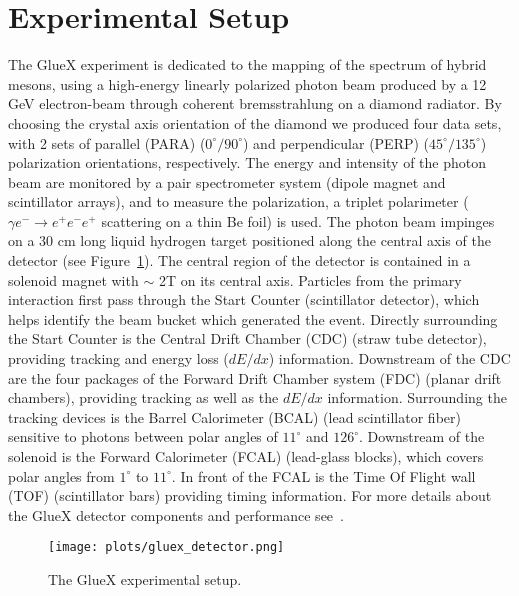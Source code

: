 \documentclass[a4paper]{jpconf}
\begin{document}
\section{Experimental Setup}
The GlueX experiment is dedicated to the mapping of the spectrum of hybrid mesons, using a high-energy linearly polarized photon beam produced by a 12 GeV electron-beam through coherent bremsstrahlung on a diamond radiator. By choosing the crystal axis orientation of the diamond we produced four data sets, with 2 sets of parallel (PARA) ($0^{\circ}/90^{\circ}$) and perpendicular (PERP) ($45^{\circ}/135^{\circ}$) polarization orientations, respectively. The energy and intensity of the photon beam are monitored by a pair spectrometer system (dipole magnet and scintillator arrays), and to measure the polarization, a triplet polarimeter ($\gamma e^{-} \rightarrow e^{+}e^{-}e^{+}$ scattering on a thin Be foil) is used. The photon beam impinges on a 30 cm long liquid hydrogen target positioned along the central axis of the detector (see Figure~\ref{fig.1}). The central region of the detector is contained in a solenoid magnet with $\sim$ 2T on its central axis. Particles from the primary interaction first pass through the Start Counter (scintillator detector), which helps identify the beam bucket which generated the event. Directly surrounding the Start Counter is the Central Drift Chamber (CDC) (straw tube detector), providing tracking and energy loss ($dE/dx$) information. Downstream of the CDC are the four packages of the Forward Drift Chamber system (FDC) (planar drift chambers), providing tracking as well as the $dE/dx$ information. Surrounding the tracking devices is the Barrel Calorimeter (BCAL) (lead scintillator fiber) sensitive to photons between polar angles of $11^{\circ}$ and $126^{\circ}$. Downstream of the solenoid is the Forward Calorimeter (FCAL) (lead-glass blocks), which covers polar angles from $1^{\circ}$ to $11^{\circ}$. In front of the FCAL is the Time Of Flight wall (TOF) (scintillator bars) providing timing information. For more details about the GlueX detector components and performance see~\cite{ref.3}.

\begin{figure}[h]
    \centering
    \texttt{[image: plots/gluex\_detector.png]}
    \caption{\label{fig.1}The GlueX experimental setup.}
\end{figure}
\end{document}
